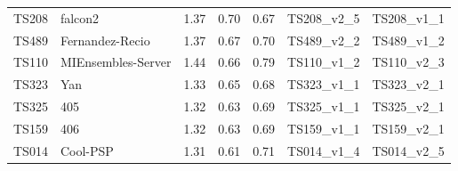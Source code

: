 \begin{table}[ht]
{\begin{tabular}{llrrrll}
TS208 & falcon2 & 1.37 & 0.70 & 0.67 & TS208\_v2\_5 & TS208\_v1\_1 \\ 
TS489 & Fernandez-Recio & 1.37 & 0.67 & 0.70 & TS489\_v2\_2 & TS489\_v1\_2 \\ 
TS110 & MIEnsembles-Server & 1.44 & 0.66 & 0.79 & TS110\_v1\_2 & TS110\_v2\_3 \\ 
TS323 & Yan & 1.33 & 0.65 & 0.68 & TS323\_v1\_1 & TS323\_v2\_1 \\ 
TS325 & 405 & 1.32 & 0.63 & 0.69 & TS325\_v1\_1 & TS325\_v2\_1 \\ 
TS159 & 406 & 1.32 & 0.63 & 0.69 & TS159\_v1\_1 & TS159\_v2\_1 \\ 
TS014 & Cool-PSP & 1.31 & 0.61 & 0.71 & TS014\_v1\_4 & TS014\_v2\_5 \\ 
\bottomrule
\end{tabular}%
}
\end{table}
